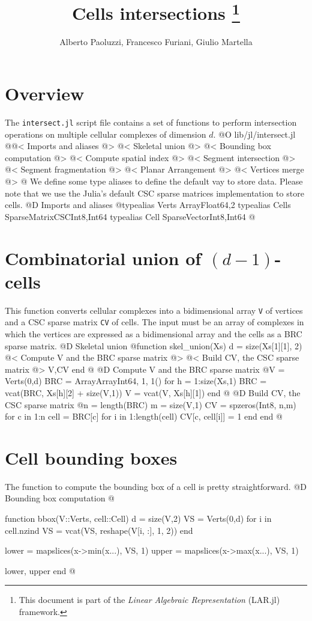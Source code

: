 \documentclass[10pt,oneside]{article}
\author{Alberto Paoluzzi, Francesco Furiani, Giulio Martella}
\title{Cells intersections
\footnote{This document is part of the \emph{Linear Algebraic Representation} (LAR.jl) framework.}
}
\begin{document}
\maketitle
\newpage

\section{Overview}
The \texttt{intersect.jl} script file contains a set of functions to perform intersection
operations on multiple cellular complexes of dimension $d$.
@O lib/jl/intersect.jl
@{@< Imports and aliases @>
@< Skeletal union @>
@< Bounding box computation @>
@< Compute spatial index @>
@< Segment intersection @>
@< Segment fragmentation @>
@< Planar Arrangement @>
@< Vertices merge @>
@}
We define some type aliases to define the default vay to store data.
Please note that we use the Julia's default CSC sparse matrices implementation
to store cells.
@D Imports and aliases
@{typealias Verts Array{Float64,2}
typealias Cells SparseMatrixCSC{Int8,Int64}
typealias Cell SparseVector{Int8,Int64}
@}

\section{Combinatorial union of $(d-1)$-cells}
This function converts cellular complexes into a bidimensional array \texttt{V} of 
vertices and a CSC sparse matrix \texttt{CV} of cells. The input must be an array of complexes
in which the vertices are expressed as a bidimensional array and the cells as a BRC
sparse matrix.
@D Skeletal union
@{function skel_union(Xs)
    d = size(Xs[1][1], 2)
    @< Compute V and the BRC sparse matrix @>
    @< Build CV, the CSC sparse matrix @>
    V,CV
end
@}
@D Compute V and the BRC sparse matrix
@{V = Verts(0,d)
BRC = Array{Array{Int64, 1}, 1}()
for h = 1:size(Xs,1)
    BRC = vcat(BRC, Xs[h][2] + size(V,1))
    V = vcat(V, Xs[h][1])
end
@}
@D Build CV, the CSC sparse matrix
@{n = length(BRC)
m = size(V,1)
CV = spzeros(Int8, n,m)
for c in 1:n
    cell = BRC[c]
    for i in 1:length(cell)
        CV[c, cell[i]] = 1
    end
end
@}


\section{Cell bounding boxes}
The function to compute the bounding box of a cell
is pretty straightforward.
@D Bounding box computation
@{function bbox(V::Verts, cell::Cell)
    d = size(V,2)
    VS = Verts(0,d)
    for i in cell.nzind
        VS = vcat(VS, reshape(V[i, :], 1, 2))
    end
    
    lower = mapslices(x->min(x...), VS, 1)
    upper = mapslices(x->max(x...), VS, 1)
    
    lower, upper
end
@}
\end{document}
